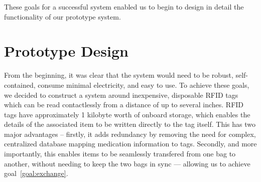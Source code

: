 \documentclass{sigchi}
\begin{document}
These goals for a successful system enabled us to begin to design in
detail the functionality of our prototype system.


\section{Prototype Design} \label{design}
From the beginning, it was clear that the system would need to be robust,
self-contained, consume minimal electricity, and easy to use. To achieve
these goals, we decided to construct a system around inexpensive,
disposable RFID tags which can be read contactlessly from a distance of up
to several inches. RFID tags have approximately 1 kilobyte worth of onboard
storage, which enables the details of the associated item to be written
directly to the tag itself. This has two major advantages – firstly, it adds
redundancy by removing the need for complex, centralized database mapping
medication information to tags. Secondly, and more importantly, this enables
items to be seamlessly transfered from one bag to another, without needing to
keep the two bags in sync --- allowing us to achieve goal~\ref{goal:exchange}.
\end{document}

